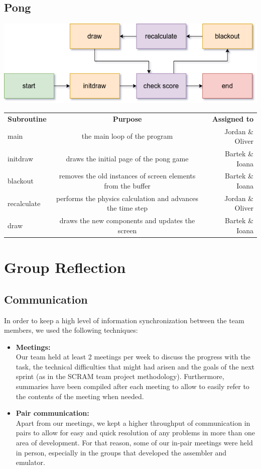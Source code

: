 \documentclass[11pt]{article}
\begin{document}
\subsection*{Pong}
\begin{center}
	\includegraphics[scale=0.7]{pong}\\
\end{center}
\begin{center}
	\begin{tabular}{l|c|r}
		\textbf{Subroutine} & \textbf{Purpose} & \textbf{Assigned to}\\
		main & the main loop of the program & Jordan \& Oliver\\
		initdraw & draws the initial page of the pong game & Bartek \& Ioana\\
		blackout & removes the old instances of screen elements from the buffer & Bartek \& Ioana\\
		recalculate & performs the physics calculation and advances the time step & Jordan \& Oliver\\
		draw & draws the new components and updates the screen & Bartek \& Ioana\\
	\end{tabular}
\end{center}
\section{Group Reflection}
\subsection*{Communication}
In order to keep a high level of information synchronization between the team members, we used the following techniques:
\begin{itemize}
\item \textbf{Meetings:}\\
Our team held at least 2 meetings per week to discuss the progress with the task, the technical difficulties that might had arisen and the goals of the next sprint (as in the SCRAM team project methodology). Furthermore, summaries have been compiled after each meeting to allow to easily refer to the contents of the meeting when needed. 
\item \textbf{Pair communication:}\\
Apart from our meetings, we kept a higher throughput of communication in pairs to allow for easy and quick resolution of any problems in more than one area of development. For that reason, some of our in-pair meetings were held in person, especially in the groups that developed the assembler and emulator.
\end{itemize}
\end{document}

